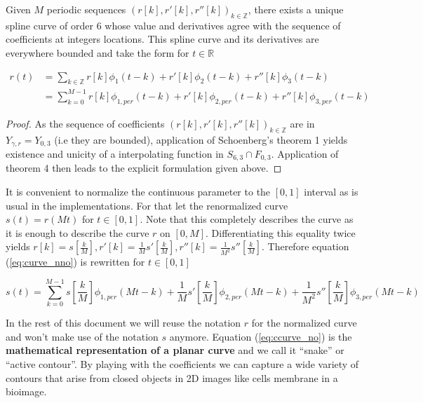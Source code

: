\documentclass[a4paper, 11pt]{article}
\begin{document}
\begin{cor}{1}
  Given $M$ periodic sequences  ${(r[k], r'[k], r''[k])}_{k \in \mathbb{Z}}$, there exists a unique spline curve of 
  order $6$ whose value and derivatives agree with the sequence of coefficients at integers locations. This spline curve 
  and its derivatives are everywhere bounded and take the form for $t \in \mathbb{R}$

\begin{align}
  r(t) &= \sum_{k \in \mathbb{Z}} r[k] \phi_1(t-k) + r'[k] \phi_2(t-k) + r''[k] \phi_3(t-k) \\
  &= \sum_{k=0}^{M-1} r[k] \phi_{1, per}(t-k) + r'[k] \phi_{2, per}(t-k) + r''[k] \phi_{3, per}(t-k) 
  \label{eq:curve_nno}
\end{align}

\end{cor}

\begin{proof}
As the sequence of coefficients ${(r[k], r'[k], r''[k])}_{k \in \mathbb{Z}}$  are in $Y_{\gamma, r} = Y_{0, 3}$ (i.e 
they are bounded), application of Schoenberg's theorem 1 yields existence and unicity of a interpolating function in 
$S_{6,3} \cap F_{0, 3}$. Application of theorem 4 then leads to the explicit formulation given above.
\end{proof}

\begin{remark}{1} It is convenient to normalize the continuous parameter to the $[0,1]$ interval as is usual in the 
  implementations.  For that let the renormalized curve $s(t) = r(Mt)$ for $t \in [0,1]$. Note that this completely 
  describes the curve as it is enough to describe the curve $r$ on $[0,M]$. Differentiating this equality twice yields 
  $r[k] = s[\frac{k}{M}], r'[k] = \frac{1}{M} s'[\frac{k}{M}], r''[k] = \frac{1}{M^2} s''[\frac{k}{M}]$. Therefore 
  equation (\ref{eq:curve_nno}) is rewritten for $t \in [0,1]$

\begin{equation}
  \label{eq:ccurve_no}
  s(t) = \sum_{k=0}^{M-1} s[\frac{k}{M}] \phi_{1, per}(Mt-k) + \frac{1}{M} s'[\frac{k}{M}] \phi_{2, per}(Mt-k) + 
  \frac{1}{M^2} s''[\frac{k}{M}] \phi_{3, per}(Mt-k)
\end{equation}

\end{remark}

In the rest of this document we will reuse the notation $r$ for the normalized curve and won't make use of the notation 
$s$ anymore. Equation (\ref{eq:ccurve_no}) is the \textbf{mathematical representation of a planar curve} and we call it 
“snake” or “active contour”. By playing with the coefficients we can capture a wide variety of contours that arise from 
closed objects in 2D images like cells membrane in a bioimage. 
\end{document}
